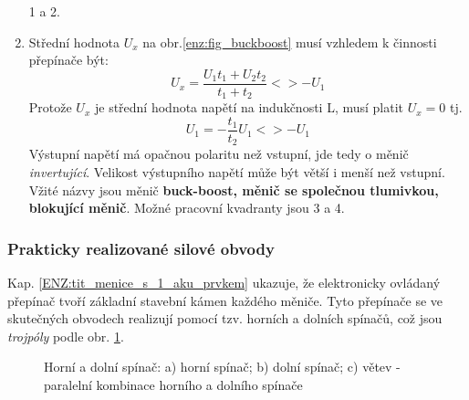 \begin{enumerate}[noitemsep]
                1 a 2.
          \item Střední hodnota $U_x$ na obr.\ref{enz:fig_buckboost} musí vzhledem k činnosti
                přepínače být:
                \begin{equation}\label{aes:eq020}
                  U_x = \frac{U_1t_1 + U_2t_2}{t_1 + t_2} <> - U_1
                \end{equation}
                Protože $U_x$ je střední hodnota napětí na indukčnosti L, musí platit $U_x =0$ tj.
                \begin{equation}\label{aes:eq017}
                  U_1 = - \frac{t_1}{t_2}U_1 <> - U_1
                \end{equation}
                Výstupní napětí má opačnou polaritu než vstupní, jde tedy o měnič
                \emph{invertující}. Velikost výstupního napětí může být větší i menší než vstupní.
                Vžité názvy jsou měnič \textbf{buck-boost, měnič se společnou tlumivkou, blokující
                měnič}. Možné pracovní kvadranty jsou 3 a 4.
        \end{enumerate}
        
      \subsubsection{Prakticky realizované silové obvody}\label{aes:sec001}
        Kap. \ref{ENZ:tit_menice_s_1_aku_prvkem} ukazuje, že elektronicky ovládaný přepínač tvoří
        základní stavební kámen každého měniče. Tyto přepínače se ve skutečných obvodech realizují
        pomocí tzv. horních a dolních spínačů, což jsou \emph{trojpóly} podle obr.
        \ref{aes:fig001}.
        \begin{figure}[ht!]
          \centering
            \hspace{1em}
            \hspace{1em}
          \caption{Horní a dolní spínač: a) horní spínač; b) dolní spínač; c) větev - paralelní 
            kombinace horního a dolního spínače}
          \label{aes:fig001}
        \end{figure}
        
